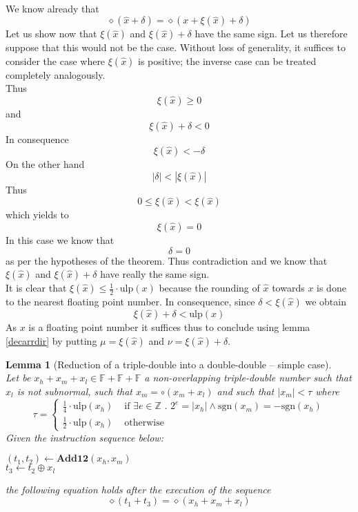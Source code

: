 \documentclass[a4paper,10pt,twoside]{article}
\newtheorem{lemma}[theorem]{Lemma}
\newenvironment{proof}[1][Proof]{\begin{trivlist}
\item[\hskip \labelsep {\bfseries #1}]}{\end{trivlist}}
\newcommand{\qed}{\nobreak \ifvmode \relax \else \ifdim \lastskip<1.5em \hskip-\lastskip
\hskip1.5em plus0em minus0.5em \fi \nobreak \vrule height0.75em width0.5em depth0.25em\fi}
\newcommand{\Z}{\ensuremath{\mathbb {Z}}}
\newcommand{\F}{\ensuremath{\mathbb {F}}}
\newcommand{\hi}{\ensuremath{\mathit{h}}}
\newcommand{\mi}{\ensuremath{\mathit{m}}}
\newcommand{\lo}{\ensuremath{\mathit{l}}}
\newcommand{\mAdd}{\ensuremath{\mathbf{Add12}}}
\newcommand{\mUlp}{\ensuremath{\mathrm{ulp}}}
\newcommand{\sgn}{\ensuremath{\mathrm{sgn}}}
\begin{document}
\begin{proof} ~ \\
We know already that
$$\diamond \left( \hat{x} + \delta \right) = \diamond \left( x + \xi\left( \hat{x} \right) + \delta \right)$$
Let us show now that $\xi\left( \hat{x} \right)$ and $\xi\left( \hat{x} \right) + \delta$ have the same sign.
Let us therefore suppose that this would not be the case.
Without loss of generality, it suffices to consider the case where $\xi\left( \hat{x} \right)$ is positive; the
inverse case can be treated completely analogously. \\
Thus $$\xi\left( \hat{x} \right) \geq 0$$ and $$\xi\left( \hat{x} \right) + \delta < 0$$
In consequence $$\xi\left( \hat{x} \right) < - \delta$$
On the other hand $$\left \vert \delta \right \vert < \left \vert \xi\left( \hat{x} \right) \right \vert$$
Thus
$$0 \leq \xi\left( \hat{x} \right) < \xi\left( \hat{x} \right)$$
which yields to
$$\xi\left( \hat{x} \right) = 0$$
In this case we know that $$\delta = 0$$ as per the hypotheses of the theorem. Thus contradiction and we know that
$\xi\left( \hat{x} \right)$ and $\xi\left( \hat{x} \right) + \delta$ have really the same sign.\\
It is clear that $\xi\left( \hat{x} \right) \leq \frac{1}{2} \cdot \mUlp\left( x \right)$ because the rounding of $\hat{x}$
towards $x$ is done to the nearest floating point number. In consequence, since $\delta < \xi\left( \hat{x} \right)$ we obtain
$$\xi\left( \hat{x} \right) + \delta < \mUlp\left( x \right)$$
As $x$ is a floating point number it suffices thus to conclude using lemma \ref{decarrdir}
by putting $\mu = \xi\left( \hat{x} \right)$ and
$\nu = \xi\left( \hat{x} \right) + \delta$.\qed
\end{proof}
\begin{lemma}[Reduction of a triple-double into a double-double -- simple case] \label{moinsquunmiulp} ~ \\
Let be $x_\hi + x_\mi + x_\lo \in \F + \F + \F$ a non-overlapping triple-double number such that $x_\lo$ is not subnormal, such that
$x_\mi = \circ \left( x_\mi + x_\lo \right)$ and such that $\left \vert x_\mi \right \vert < \tau$ where
$$\tau = \left \lbrace \begin{array}{ll}
\frac{1}{4} \cdot \mUlp\left( x_\hi \right) & \mbox{ if } \exists e \in \Z \mbox{ . } 2^e = \left \vert x_\hi \right \vert \land
\sgn\left( x_\mi \right) = -\sgn\left( x_\hi \right)\\
\frac{1}{2} \cdot \mUlp\left( x_\hi \right) & \mbox{ otherwise} \end{array} \right.$$
Given the instruction sequence below:
\begin{center}
\begin{minipage}[b]{50mm}
$\left( t_1, t_2 \right) \gets \mAdd\left( x_\hi, x_\mi \right)$ \\
$t_3 \gets t_2 \oplus x_\lo$
\end{minipage}
\end{center}
the following equation holds after the execution of the sequence
$$\diamond\left( t_1 + t_3 \right) = \diamond\left( x_\hi + x_\mi + x_\lo \right)$$
\end{lemma}
\end{document}
